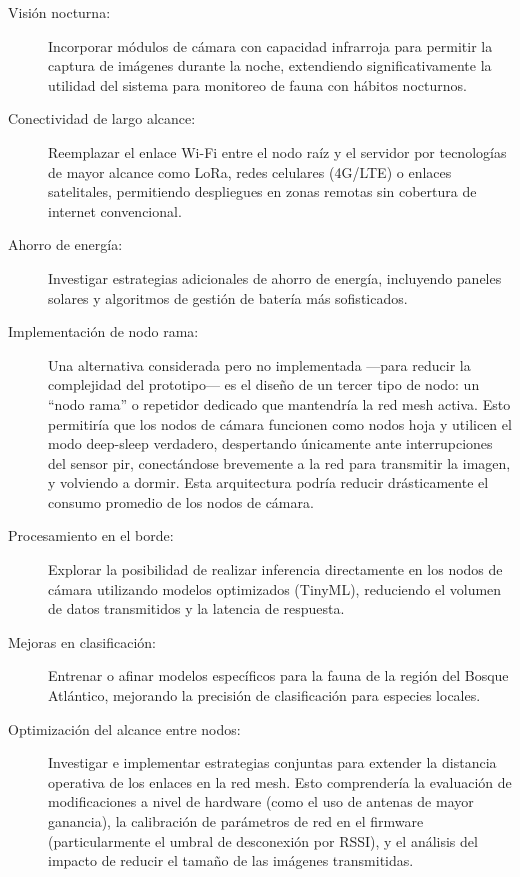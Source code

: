 \documentclass[a4paper, 12pt]{report}
\begin{document}
\begin{description}
  \item[Visión nocturna:] Incorporar módulos de cámara con capacidad
    infrarroja para permitir la captura de imágenes durante la noche,
    extendiendo significativamente la utilidad del sistema para
    monitoreo de fauna con hábitos nocturnos.

  \item[Conectividad de largo alcance:] Reemplazar el enlace Wi-Fi entre
    el nodo raíz y el servidor por tecnologías de mayor alcance como
    LoRa, redes celulares (4G/LTE) o enlaces satelitales, permitiendo
    despliegues en zonas remotas sin cobertura de internet convencional.

  \item[Ahorro de energía:] Investigar estrategias
    adicionales de ahorro de energía, incluyendo paneles solares y
    algoritmos de gestión de batería más sofisticados.

  \item[Implementación de nodo rama:] Una alternativa considerada pero no
    implementada ---para reducir la complejidad del prototipo--- es el
    diseño de un tercer tipo de nodo: un ``nodo rama'' o repetidor
    dedicado que mantendría la red mesh activa. Esto permitiría que
    los nodos de cámara funcionen como nodos hoja y utilicen el modo
    \gls{deep-sleep} verdadero, despertando únicamente ante
    interrupciones del sensor \gls{pir}, conectándose brevemente a la
    red para transmitir la imagen, y volviendo a dormir. Esta
    arquitectura podría reducir drásticamente el consumo promedio de
    los nodos de cámara.

  \item[Procesamiento en el borde:] Explorar la posibilidad de realizar
    inferencia directamente en los nodos de cámara utilizando modelos
    optimizados (TinyML), reduciendo el volumen de datos transmitidos
    y la latencia de respuesta.

  \item[Mejoras en clasificación:] Entrenar o afinar modelos específicos
    para la fauna de la región del Bosque Atlántico, mejorando la
    precisión de clasificación para especies locales.

  \item[Optimización del alcance entre nodos:] Investigar e implementar
    estrategias conjuntas para extender la distancia operativa de los enlaces
    en la red \gls{mesh}. Esto comprendería la evaluación de modificaciones a
    nivel de hardware (como el uso de antenas de mayor ganancia), la
    calibración de parámetros de red en el firmware (particularmente el
    umbral de desconexión por RSSI), y el análisis del impacto de
    reducir el tamaño de las imágenes transmitidas.


\end{description}
\end{document}
